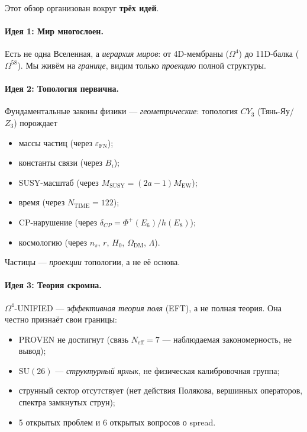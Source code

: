 \documentclass[11pt,a4paper]{article}
\newcommand{\SU}{\mathrm{SU}}
\newcommand{\CY}{CY_3}
\newcommand{\Om}{\Omega^4}
\newcommand{\Omfi}{\Omega^{58}}
\newcommand{\Neff}{N_{\text{eff}}}
\newcommand{\MEW}{M_{\text{EW}}}
\newcommand{\MSUSY}{M_{\text{SUSY}}}
\newcommand{\epsFN}{\varepsilon_{\text{FN}}}
\theoremstyle{definition}
\begin{document}
Этот обзор организован вокруг \textbf{трёх идей}.

\paragraph{Идея 1: Мир многослоен.}
Есть не одна Вселенная, а \emph{иерархия миров}: от 4D-мембраны 
($\Om$) до 11D-балка ($\Omfi$). Мы живём на \emph{границе}, 
видим только \emph{проекцию} полной структуры.

\paragraph{Идея 2: Топология первична.}
Фундаментальные законы физики — \emph{геометрические}: топология 
$\CY$ (Тянь-Яу/$Z_3$) порождает
\begin{itemize}
    \item массы частиц (через $\epsFN$);
    \item константы связи (через $B_i$);
    \item SUSY-масштаб (через $\MSUSY = (2a-1) \MEW$);
    \item время (через $N_{\text{TIME}} = 122$);
    \item CP-нарушение (через $\delta_{CP} = \Phi^+(E_6)/h(E_8)$);
    \item космологию (через $n_s$, $r$, $H_0$, $\Omega_{\text{DM}}$, 
          $\Lambda$).
\end{itemize}
Частицы — \emph{проекции} топологии, а не её основа.

\paragraph{Идея 3: Теория скромна.}
$\Om$-UNIFIED — \emph{эффективная теория поля} (EFT), а не полная 
теория. Она честно признаёт свои границы:
\begin{itemize}
    \item PROVEN не достигнут (связь $\Neff = 7$ — наблюдаемая 
          закономерность, не вывод);
    \item $\SU(26)$ — \emph{структурный ярлык}, не физическая 
          калибровочная группа;
    \item струнный сектор отсутствует (нет действия Полякова, 
          вершинных операторов, спектра замкнутых струн);
    \item 5 открытых проблем и 6 открытых вопросов о spread.
\end{itemize}
\end{document}
